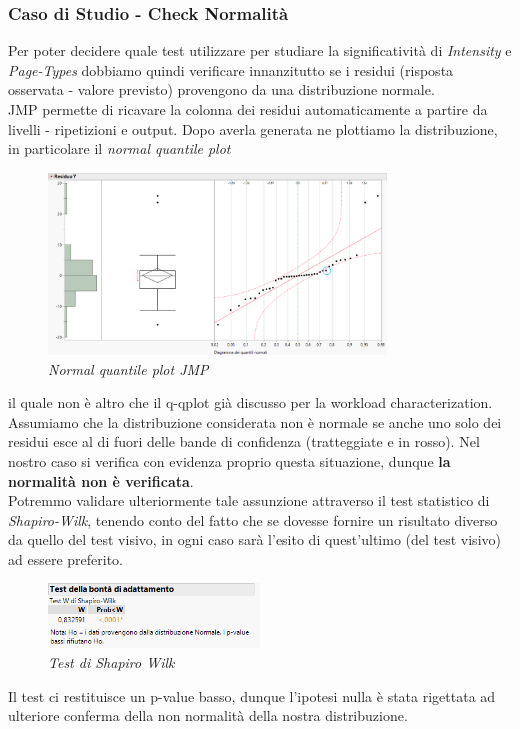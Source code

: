 \subsubsection{Caso di Studio - Check Normalità}
Per poter decidere quale test utilizzare per studiare la significatività di \textit{Intensity} e \textit{Page-Types} dobbiamo quindi verificare innanzitutto se i residui (risposta osservata - valore previsto) provengono da una distribuzione normale.
\\JMP permette di ricavare la colonna dei residui automaticamente a partire da livelli - ripetizioni e output. Dopo averla generata ne plottiamo la distribuzione, in particolare il \textit{normal quantile plot}
\begin{figure}[H]
	\centering
	\includegraphics[width=0.8\textwidth]{img/hw4/qqplot_res.png}
	\caption{\textit{Normal quantile plot JMP}}
\end{figure}
il quale non è altro che il q-qplot già discusso per la workload characterization.
\\Assumiamo che la distribuzione considerata non è normale se anche uno solo dei residui esce al di fuori delle bande di confidenza (tratteggiate e in rosso). Nel nostro caso si verifica con evidenza proprio questa situazione, dunque \textbf{la normalità non è verificata}.
\\Potremmo validare ulteriormente tale assunzione attraverso il test statistico di \textit{Shapiro-Wilk}, tenendo conto del fatto che se dovesse fornire un risultato diverso da quello del test visivo, in ogni caso sarà l'esito di quest'ultimo (del test visivo) ad essere preferito.
\begin{figure}[H]
	\centering
	\includegraphics[width=0.5\textwidth]{img/hw4/shapiro_wilch.png}
	\caption{\textit{Test di Shapiro Wilk}}
\end{figure}
Il test ci restituisce un p-value basso, dunque l'ipotesi nulla è stata rigettata ad ulteriore conferma della non normalità della nostra distribuzione.

